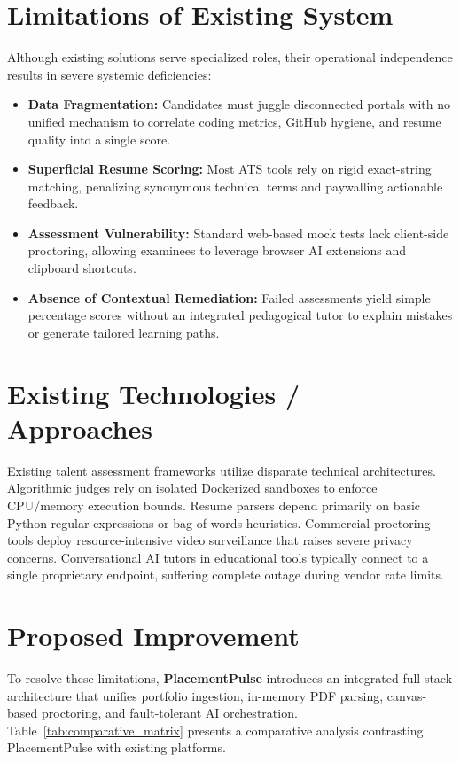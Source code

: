 \documentclass[12pt,a4paper]{report}
\begin{document}
\section{Limitations of Existing System}
Although existing solutions serve specialized roles, their operational independence results in severe systemic deficiencies:
\begin{itemize}
    \item \textbf{Data Fragmentation:} Candidates must juggle disconnected portals with no unified mechanism to correlate coding metrics, GitHub hygiene, and resume quality into a single score.
    \item \textbf{Superficial Resume Scoring:} Most ATS tools rely on rigid exact-string matching, penalizing synonymous technical terms and paywalling actionable feedback.
    \item \textbf{Assessment Vulnerability:} Standard web-based mock tests lack client-side proctoring, allowing examinees to leverage browser AI extensions and clipboard shortcuts.
    \item \textbf{Absence of Contextual Remediation:} Failed assessments yield simple percentage scores without an integrated pedagogical tutor to explain mistakes or generate tailored learning paths.
\end{itemize}

\section{Existing Technologies / Approaches}
Existing talent assessment frameworks utilize disparate technical architectures. Algorithmic judges rely on isolated Dockerized sandboxes to enforce CPU/memory execution bounds. Resume parsers depend primarily on basic Python regular expressions or bag-of-words heuristics. Commercial proctoring tools deploy resource-intensive video surveillance that raises severe privacy concerns. Conversational AI tutors in educational tools typically connect to a single proprietary endpoint, suffering complete outage during vendor rate limits.

\section{Proposed Improvement}
To resolve these limitations, \textbf{PlacementPulse} introduces an integrated full-stack architecture that unifies portfolio ingestion, in-memory PDF parsing, canvas-based proctoring, and fault-tolerant AI orchestration. Table~\ref{tab:comparative_matrix} presents a comparative analysis contrasting PlacementPulse with existing platforms.
\end{document}
